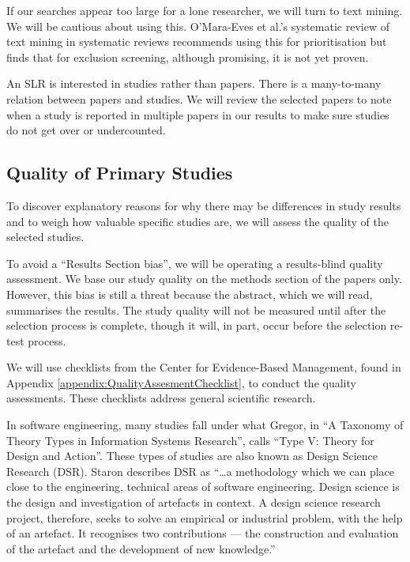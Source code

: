 If our searches appear too large for a lone researcher, we will turn to text mining.
We will be cautious about using this.
O'Mara-Eves et al.'s\cite{OMara-Eves_2015} systematic review of text mining in systematic reviews recommends using this for prioritisation but finds that for exclusion screening, although promising, it is not yet proven.

An SLR is interested in studies rather than papers.
There is a many-to-many relation between papers and studies.
We will review the selected papers to note when a study is reported in multiple papers in our results to make sure studies do not get over or undercounted.

\subsection{Quality of Primary Studies}
To discover explanatory reasons for why there may be differences in study results and to weigh how valuable specific studies are, we will assess the quality of the selected studies.

To avoid a ``Results Section bias'', we will be operating a results-blind quality assessment.
We base our study quality on the methods section of the papers only.
However, this bias is still a threat because the abstract, which we will read, summarises the results.
The study quality will not be measured until after the selection process is complete, though it will, in part, occur before the selection re-test process.

We will use checklists from the Center for Evidence-Based Management, found in Appendix \ref{appendix:QualityAssesmentChecklist}, to conduct the quality assessments. 
These checklists address general scientific research.

In software engineering, many studies fall under what Gregor\cite{gregor2006nature}, in ``A Taxonomy of Theory Types in Information Systems Research'', calls ``Type V: Theory for Design and Action''.
These types of studies are also known as Design Science Research (DSR).
Staron\cite{Staron_2019} describes DSR as ``\dots a methodology which we can place close to the engineering, technical areas of software engineering. 
Design science is the design and investigation of artefacts in context. 
A design science research project, therefore, seeks to solve an empirical or industrial problem, with the help of an artefact. 
It recognises two contributions — the construction and evaluation of the artefact and the development of new knowledge.''

